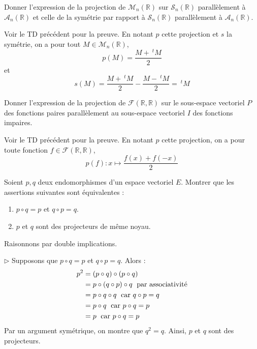 \documentclass[a4paper,10pt]{report}
\begin{document}
\medskip

\begin{Exa} Donner l'expression de la projection de $\mathcal{M}_n(\mathbb{R})$ sur $\mathcal{S}_n(\mathbb{R})$ parallèlement à $\mathcal{A}_n(\mathbb{R})$ et celle de la symétrie par rapport à $\mathcal{S}_n(\mathbb{R})$ parallèlement à $\mathcal{A}_n(\mathbb{R})$.
\end{Exa}

\corr Voir le TD précédent pour la preuve. En notant $p$ cette projection et $s$ la symétrie, on a pour tout $M \in \mathcal{M}_n(\mathbb{R})$, 
$$ p(M) = \dfrac{M+ ~^t M}{2}$$
et 
$$ s(M) =  \dfrac{M+ ~^t M}{2} -  \dfrac{M- ~^t M}{2} =~^t M$$

\medskip



\begin{Exa} Donner l'expression de la projection de $\mathcal{F}(\mathbb{R}, \mathbb{R})$ sur le sous-espace vectoriel $P$ des fonctions paires parallèlement au sous-espace vectoriel $I$ des fonctions impaires.
\end{Exa}

\corr Voir le TD précédent pour la preuve. En notant $p$ cette projection, on a pour toute fonction $f \in \mathcal{F}(\mathbb{R}, \mathbb{R})$,
$$ p(f) : x  \mapsto \dfrac{f(x)+f(-x)}{2}$$

\medskip


\begin{Exa} Soient $p,q$ deux endomorphismes d'un espace vectoriel $E$. Montrer que les assertions suivantes sont équivalentes :
    \begin{enumerate}
\item $p \circ q = p$ et $q \circ p = q$.
\item $p$ et $q$ sont des projecteurs de même noyau.
    \end{enumerate}
\end{Exa}

\corr Raisonnons par double implications.

\medskip

\noindent $\rhd$ Supposons que $p \circ q = p$ et $q \circ p = q$.  Alors :
\begin{align*}
p^2 & = (p \circ q) \circ (p \circ q) \\
&=p \circ (q \circ p) \circ q \; \hbox{ par associativité} \\
& =p \circ q \circ q  \; \hbox{ car } q \circ p = q\\
&=  p \circ q \; \hbox{ car } p \circ q = p\\
& = p \; \hbox{ car }  p\circ q = p
\end{align*}
Par un argument symétrique, on montre que $q^2=q$. Ainsi, $p$ et $q$ sont des projecteurs.
\end{document}
